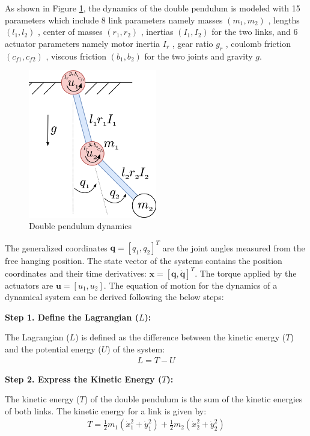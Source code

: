 As shown in Figure \ref{fig:double pendulum dynamics}, the dynamics of the double pendulum is modeled with 15 parameters which include 8 link parameters namely masses \((m_1,m_2)\)
, lengths \((l_1,l_2)\)
, center of masses \((r_1,r_2)\) 
, inertias \((I_1,I_2)\)
 for the two links, and 6 actuator parameters namely motor inertia \(I_r\)
, gear ratio \(g_r\)
, coulomb friction \((c_{f1},c_{f2})\)
, viscous friction \((b_1,b_2)\)
 for the two joints and gravity \(g\).
\begin{figure}[h]
  \centering
  \includegraphics[width=0.5\textwidth]{figures/double_pendulum_dynamics.png} %
  \caption{Double pendulum dynamics\cite{double_pendulum_dynamics}}
  \label{fig:double pendulum dynamics}
\end{figure}

The generalized coordinates \( \mathbf{q} =[q_1,q_2]^T \) are the joint angles measured from the free hanging position. The state vector of the systems contains the position coordinates and their time derivatives: \(\mathbf{x}=[\mathbf{q},\mathbf{\dot{q}}]^T\). The torque applied by the actuators are \(\mathbf{u}=[u_1,u_2]\). The equation of motion for the dynamics of a dynamical system can be derived following the below steps:

\textbf{Step 1. Define the Lagrangian (\(L\)):}

   The Lagrangian (\(L\)) is defined as the difference between the kinetic energy (\(T\)) and the potential energy (\(U\)) of the system:
   \begin{align}
         L = T - U
   \end{align}


\textbf{Step 2. Express the Kinetic Energy (\(T\)):}

   The kinetic energy (\(T\)) of the double pendulum is the sum of the kinetic energies of both links. The kinetic energy for a link is given by:
   \begin{align}
        \label{eq:kinetic energy}
        T = \frac{1}{2} m_1 (\dot{x}_1^2 + \dot{y}_1^2) + \frac{1}{2} m_2 (\dot{x}_2^2 + \dot{y}_2^2)
   \end{align}

